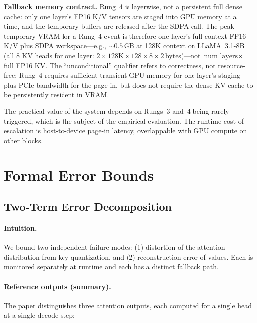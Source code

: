 \documentclass[10pt,twocolumn,a4paper]{article}
\theoremstyle{definition}
\theoremstyle{remark}
\begin{document}
\textbf{Fallback memory contract.}  Rung~4 is layerwise, not a persistent full dense cache: only one layer's FP16 K/V tensors are staged into GPU memory at a time, and the temporary buffers are released after the SDPA call.  The peak temporary VRAM for a Rung~4 event is therefore one layer's full-context FP16 K/V plus SDPA workspace---e.g., ${\sim}0.5$\,GB at 128K context on LLaMA~3.1-8B (all 8 KV heads for one layer: $2 \times 128\text{K} \times 128 \times 8 \times 2$\,bytes)---not $\text{num\_layers} \times$ full FP16 KV\@.  The ``unconditional'' qualifier refers to correctness, not resource-free: Rung~4 requires sufficient transient GPU memory for one layer's staging plus PCIe bandwidth for the page-in, but does not require the dense KV cache to be persistently resident in VRAM\@.

The practical value of the system depends on Rungs~3 and~4 being rarely triggered, which is the subject of the empirical evaluation.  The runtime cost of escalation is host-to-device page-in latency, overlappable with GPU compute on other blocks.


\section{Formal Error Bounds}
\label{sec:bounds}

\subsection{Two-Term Error Decomposition}
\label{sec:decomposition}

\paragraph{Intuition.}
We bound two independent failure modes: (1) distortion of the attention distribution from key quantization, and (2) reconstruction error of values.  Each is monitored separately at runtime and each has a distinct fallback path.

\paragraph{Reference outputs (summary).}
The paper distinguishes three attention outputs, each computed for a single head at a single decode step:
\end{document}
